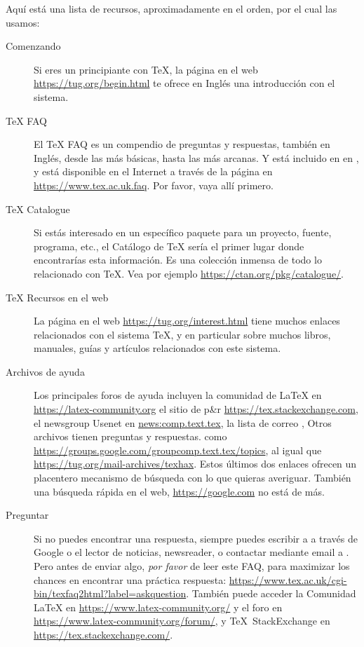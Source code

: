 \documentclass{article}
\begin{document}
Aquí está una lista de recursos, aproximadamente en el orden, por el
cual las usamos:

\begin{description}
	\item[Comenzando] Si eres un principiante con \TeX, la página en el
	web \url{https://tug.org/begin.html} te ofrece en Inglés una
	introducción con el sistema.

\item [\TeX{} FAQ] El \TeX{} FAQ es un compendio de preguntas y
respuestas, también en Inglés, desde las más básicas, hasta las más
arcanas. Y está incluido en \TL{} en
, y está disponible en el
Internet a través de la página en \url{https://www.tex.ac.uk.faq}. Por
favor, vaya allí primero.  \item [\TeX{} Catalogue] Si estás
	interesado en un específico paquete para un proyecto, fuente,
	programa, etc., el Catálogo de \TeX{} sería el primer lugar
	donde encontrarías esta información. Es una colección inmensa
	de todo lo relacionado con \TeX{}. Vea por ejemplo
	\url{https://ctan.org/pkg/catalogue/}.

\item [\TeX{} Recursos en el web] La página en el web
	\url{https://tug.org/interest.html} tiene muchos enlaces
	relacionados con el sistema \TeX{}, y en particular sobre
	muchos libros, manuales, guías y artículos relacionados con
	este sistema.

\item [Archivos de ayuda] Los principales foros de ayuda incluyen la comunidad
	de \LaTeX{} en \url{https://latex-community.org} el sitio de p\&r
		\url{https://tex.stackexchange.com}, el newsgroup Usenet en
		\url{news:comp.text.tex}, la lista de correo
		, Otros archivos tienen preguntas y
		respuestas.  como
		\url{https://groups.google.com/groupcomp.text.tex/topics}, al
		igual que \url{https://tug.org/mail-archives/texhax}. Estos
		últimos dos enlaces ofrecen un placentero mecanismo de búsqueda
		con lo que quieras averiguar.  También una búsqueda rápida en
		el web, \url{https://google.com} no está de más.

\item [Preguntar] Si no puedes encontrar una respuesta, siempre puedes
	escribir a  a través de Google o el
	lector de noticias, newsreader, o contactar mediante email a
	. Pero antes de enviar algo, \emph{por
	favor} de leer este FAQ, para maximizar los chances en
	encontrar una práctica respuesta:
	\url{https://www.tex.ac.uk/cgi-bin/texfaq2html?label=askquestion}.
	También puede acceder la Comunidad \LaTeX{} en
	\url{https://www.latex-community.org/} y el foro en
	\url{https://www.latex-community.org/forum/}, y \TeX\
	StackExchange en \url{https://tex.stackexchange.com/}.


\end{description}
\end{document}
